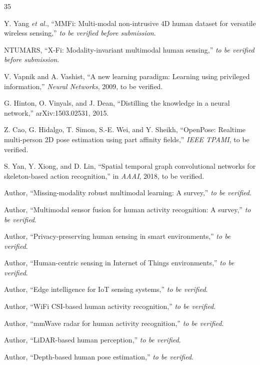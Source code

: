 \documentclass[journal]{IEEEtran}
\begin{document}
\begin{thebibliography}{35}

Y. Yang \emph{et al.}, ``MMFi: Multi-modal non-intrusive 4D human dataset for versatile wireless sensing,'' \emph{to be verified before submission}.

NTUMARS, ``X-Fi: Modality-invariant multimodal human sensing,'' \emph{to be verified before submission}.

V. Vapnik and A. Vashist, ``A new learning paradigm: Learning using privileged information,'' \emph{Neural Networks}, 2009, to be verified.

G. Hinton, O. Vinyals, and J. Dean, ``Distilling the knowledge in a neural network,'' arXiv:1503.02531, 2015.

Z. Cao, G. Hidalgo, T. Simon, S.-E. Wei, and Y. Sheikh, ``OpenPose: Realtime multi-person 2D pose estimation using part affinity fields,'' \emph{IEEE TPAMI}, to be verified.

S. Yan, Y. Xiong, and D. Lin, ``Spatial temporal graph convolutional networks for skeleton-based action recognition,'' in \emph{AAAI}, 2018, to be verified.

Author, ``Missing-modality robust multimodal learning: A survey,'' \emph{to be verified}.

Author, ``Multimodal sensor fusion for human activity recognition: A survey,'' \emph{to be verified}.

Author, ``Privacy-preserving human sensing in smart environments,'' \emph{to be verified}.

Author, ``Human-centric sensing in Internet of Things environments,'' \emph{to be verified}.

Author, ``Edge intelligence for IoT sensing systems,'' \emph{to be verified}.

Author, ``WiFi CSI-based human activity recognition,'' \emph{to be verified}.

Author, ``mmWave radar for human activity recognition,'' \emph{to be verified}.

Author, ``LiDAR-based human perception,'' \emph{to be verified}.

Author, ``Depth-based human pose estimation,'' \emph{to be verified}.


\end{thebibliography}
\end{document}

